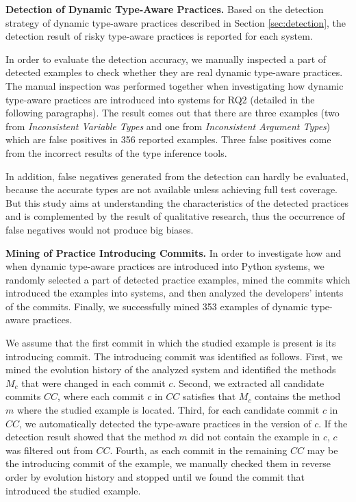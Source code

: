 \textbf{Detection of Dynamic Type-Aware Practices.} 
Based on the detection strategy of dynamic type-aware practices described in Section \ref{sec:detection}, the detection result of risky type-aware practices is reported for each system. 

In order to evaluate the detection accuracy, we manually inspected a part of detected examples to check whether they are real dynamic type-aware practices. The manual inspection was performed together when investigating how dynamic type-aware practices are introduced into systems for RQ2 (detailed in the following paragraphs). The result comes out that there are three examples (two from \emph{Inconsistent Variable Types} and one from \emph{Inconsistent Argument Types}) which are false positives in 356 reported examples. Three false positives come from the incorrect results of the type inference tools.

In addition, false negatives generated from the detection can hardly be evaluated, because the accurate types are not available unless achieving full test coverage. But this study aims at understanding the characteristics of the detected practices and is complemented by the result of qualitative research, thus the occurrence of false negatives would not produce big biases.


\textbf{Mining of Practice Introducing Commits.}
In order to investigate how and when dynamic type-aware practices are introduced into Python systems, we randomly selected a part of detected practice examples, mined the commits which introduced the examples into systems, and then analyzed the developers' intents of the commits. Finally, we successfully mined 353 examples of dynamic type-aware practices.

We assume that the first commit in which the studied example is present is its introducing commit. The introducing commit was identified as follows. First, we mined the evolution history of the analyzed system and identified the methods $M_{c}$ that were changed in each commit $c$. Second, we extracted all candidate commits $CC$, where each commit $c$ in $CC$ satisfies that $M_{c}$ contains the method $m$ where the studied example is located. Third, for each candidate commit $c$ in $CC$, we automatically detected the type-aware practices in the version of $c$. If the detection result showed that the method $m$ did not contain the example in $c$, $c$ was filtered out from $CC$. Fourth, as each commit in the remaining $CC$ may be the introducing commit of the example, we manually checked them in reverse order by evolution history and stopped until we found the commit that introduced the studied example. 


